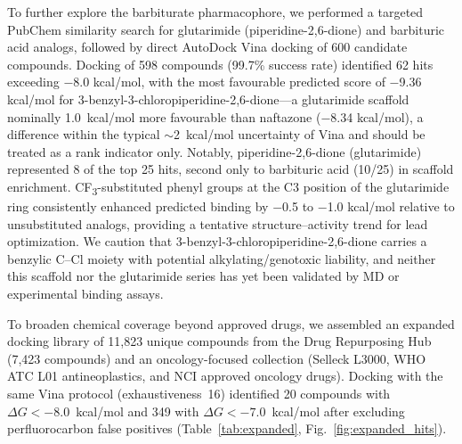 \documentclass[pdflatex,sn-nature]{sn-jnl}
\begin{document}
To further explore the barbiturate pharmacophore, we performed a targeted PubChem similarity search for glutarimide (piperidine-2,6-dione) and barbituric acid analogs, followed by direct AutoDock Vina docking of 600 candidate compounds. Docking of 598 compounds (99.7\% success rate) identified 62 hits exceeding $-$8.0 kcal/mol, with the most favourable predicted score of $-$9.36 kcal/mol for 3-benzyl-3-chloropiperidine-2,6-dione---a glutarimide scaffold nominally 1.0~kcal/mol more favourable than naftazone ($-$8.34 kcal/mol), a difference within the typical $\sim$2~kcal/mol uncertainty of Vina and should be treated as a rank indicator only. Notably, piperidine-2,6-dione (glutarimide) represented 8 of the top 25 hits, second only to barbituric acid (10/25) in scaffold enrichment. CF\textsubscript{3}-substituted phenyl groups at the C3 position of the glutarimide ring consistently enhanced predicted binding by $-$0.5 to $-$1.0 kcal/mol relative to unsubstituted analogs, providing a tentative structure--activity trend for lead optimization. We caution that 3-benzyl-3-chloropiperidine-2,6-dione carries a benzylic C--Cl moiety with potential alkylating/genotoxic liability, and neither this scaffold nor the glutarimide series has yet been validated by MD or experimental binding assays.

To broaden chemical coverage beyond approved drugs, we assembled an expanded docking library of 11,823 unique compounds from the Drug Repurposing Hub (7,423 compounds) and an oncology-focused collection (Selleck L3000, WHO ATC L01 antineoplastics, and NCI approved oncology drugs). Docking with the same Vina protocol (exhaustiveness~16) identified 20 compounds with $\Delta G < -8.0$~kcal/mol and 349 with $\Delta G < -7.0$~kcal/mol after excluding perfluorocarbon false positives (Table~\ref{tab:expanded}, Fig.~\ref{fig:expanded_hits}).
\end{document}
